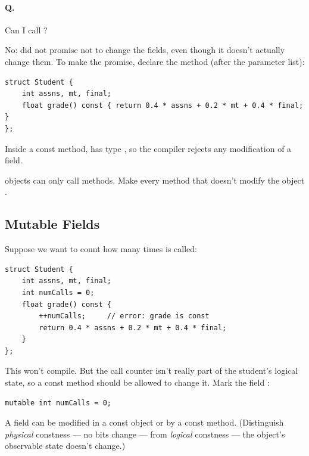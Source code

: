 \paragraph{Q.} Can I call ?

No:  did not promise not to change the fields, even though it doesn't
actually change them. To make the promise, declare the method 
(after the parameter list):
\begin{lstlisting}[style=cpp]
struct Student {
    int assns, mt, final;
    float grade() const { return 0.4 * assns + 0.2 * mt + 0.4 * final; }
};
\end{lstlisting}
Inside a const method,  has type , so the
compiler rejects any modification of a field.

\begin{important}[Rule]
 objects can only call  methods. Make every method that
doesn't modify the object .
\end{important}

\subsection{Mutable Fields}
Suppose we want to count how many times  is called:
\begin{lstlisting}[style=cpp]
struct Student {
    int assns, mt, final;
    int numCalls = 0;
    float grade() const {
        ++numCalls;     // error: grade is const
        return 0.4 * assns + 0.2 * mt + 0.4 * final;
    }
};
\end{lstlisting}
This won't compile. But the call counter isn't really part of the student's
logical state, so a const method should be allowed to change it. Mark the field
:
\begin{lstlisting}[style=cpp]
    mutable int numCalls = 0;
\end{lstlisting}
A  field can be modified in a const object or by a const method.
(Distinguish \emph{physical} constness --- no bits change --- from
\emph{logical} constness --- the object's observable state doesn't change.)

